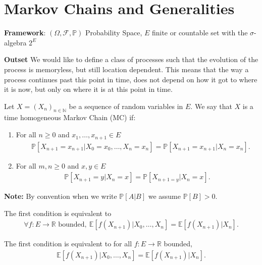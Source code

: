 \chapter{Markov Chains and Generalities}

\textbf{Framework}: $(\Omega, \mathcal{F}, \mathbb{P})$ Probability Space, $E$ finite or countable set with the $\sigma$-algebra $2^E$

\noindent
\textbf{Outset} We would like to define a class of processes such that the evolution of the process is memoryless, but still location dependent. This means that the way a process continues past this point in time, does not depend on how it got to where it is now, but only on where it is at this point in time. 

\begin{defn}
	Let $X=(X_n)_{n \in \mathbb{N}}$ be a sequence of random variables in $E$. We say that $X$ is a time homogeneous Markov Chain (MC) if:
\begin{enumerate}
	\item  For all $n \geq 0$ and $x_1,\ldots,x_{n+1} \in E$
\begin{align}
	\quad \boxed{\mathbb{P} \left[ X_{n+1}=x_{n+1} | X_0=x_0,\ldots,X_n=x_n \right] = \mathbb{P} \left[ X_{n+1}=x_{n+1} | X_n = x_n \right]}
.\end{align}
	\item For all $m,n \geq 0$ and $x,y \in E$
\begin{align}	
	\boxed{\mathbb{P} \left[ X_{n+1}=y | X_{n}=x \right] = \mathbb{P} \left[ X_{n+1=y}| X_n=x \right]} 
.\end{align}
\end{enumerate}

\end{defn}

\textbf{Note:} By convention when we write $\mathbb{P} \left[ A|B \right] $ we assume $\mathbb{P} \left[ B \right] >0$.

\begin{rmk}
The first condition is equivalent to
\begin{align}
	\forall f:E\to \mathbb{R}\textrm{ bounded},\ \mathbb{E} \left[ f(X_{n+1}) | X_0,\ldots,X_n \right] = \mathbb{E} \left[ f(X_{n+1}) | X_n \right] 
.\end{align}

\end{rmk}
{\color{blue}
\begin{rmk}
The first condition is equivalent to for all $f: E\to \mathbb{R}$ bounded,
\begin{align}
	\boxed{\mathbb{E} \left[ f(X_{n+1}) | X_0,\ldots,X_n \right] = \mathbb{E} \left[ f(X_{n+1}) | X_n \right]} 
.\end{align}

\end{rmk}
}


